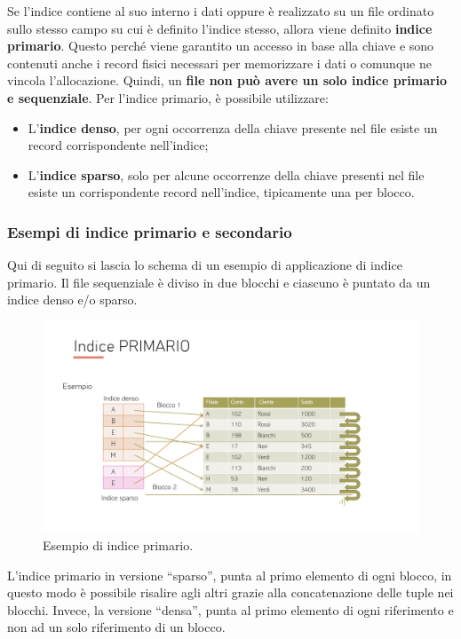 \documentclass[a4paper]{article}
\newcommand{\dquotes}[1]{``#1''}
\begin{document}
	\noindent
	Se l'indice contiene al suo interno i dati oppure è realizzato su un file ordinato sullo stesso campo su cui è definito l'indice stesso, allora viene definito \textcolor{Red3}{\textbf{indice primario}}.
	Questo perché viene garantito un accesso in base alla chiave e sono contenuti anche i record fisici necessari per memorizzare i dati o comunque ne vincola l'allocazione. Quindi, un \textbf{file non può avere un solo indice primario e sequenziale}.\newline
	Per l'indice primario, è possibile utilizzare:
	\begin{itemize}
		\item L'\textbf{indice denso}, per ogni occorrenza della chiave presente nel file esiste un record corrispondente nell'indice;
		\item L'\textbf{indice sparso}, solo per alcune occorrenze della chiave presenti nel file esiste un corrispondente record nell'indice, tipicamente una per blocco.
	\end{itemize}\newpage

	\subsubsection{Esempi di indice primario e secondario}

	Qui di seguito si lascia lo schema di un esempio di applicazione di indice primario. Il file sequenziale è diviso in due blocchi e ciascuno è puntato da un indice denso e/o sparso.
	\begin{figure}[!htp]
		\centering
		\includegraphics[width=\textwidth]{img/indice_primario.pdf}
		\caption{Esempio di indice primario.}
	\end{figure}
	
	\noindent
	L'indice primario in versione \dquotes{sparso}, punta al primo elemento di ogni blocco, in questo modo è possibile risalire agli altri grazie alla concatenazione delle tuple nei blocchi.\newline
	Invece, la versione \dquotes{densa}, punta al primo elemento di ogni riferimento e non ad un solo riferimento di un blocco.\newline
\end{document}
